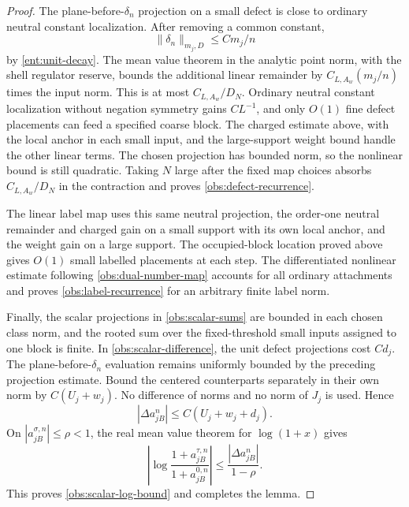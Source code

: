 \begin{proof}
The plane-before-\(\delta_n\) projection on a small defect is close
to ordinary neutral constant localization.  After removing a common
constant,
\[
                    \|\delta_n\|_{m_j,D}\le C m_j/n
\]
by \eqref{ent:unit-decay}.  The mean value theorem in the analytic
point norm, with the shell regulator reserve, bounds the additional
linear remainder by \(C_{L,A_w}(m_j/n)\) times the input norm.
This is at most \(C_{L,A_w}/D_N\).  Ordinary neutral constant
localization without negation symmetry gains \(CL^{-1}\), and only
\(O(1)\) fine defect placements can feed a specified coarse block.
The charged estimate above, with the local anchor in each small input,
and the large-support weight bound handle the other linear terms.  The
chosen projection has bounded
norm, so the nonlinear bound is still quadratic.  Taking \(N\)
large after the fixed map choices absorbs \(C_{L,A_w}/D_N\) in
the contraction and proves \eqref{obs:defect-recurrence}.

The linear label map uses this same neutral projection, the
order-one neutral remainder and charged gain on a small support with
its own local anchor, and the weight gain on a large support.  The
occupied-block
location proved above gives \(O(1)\) small labelled placements
at each step.  The differentiated nonlinear estimate following
\eqref{obs:dual-number-map} accounts for all ordinary attachments
and proves \eqref{obs:label-recurrence} for an arbitrary finite
label norm.

Finally, the scalar projections in \eqref{obs:scalar-sums} are
bounded in each chosen class norm, and the rooted sum over the
fixed-threshold small inputs assigned to one block is finite.
In \eqref{obs:scalar-difference}, the unit defect projections cost
\(Cd_j\).  The plane-before-\(\delta_n\) evaluation remains uniformly
bounded by the preceding projection estimate.  Bound the centered
counterparts separately in their own norm by \(C(U_j+w_j)\).
No difference of norms and no norm of \(J_j\) is used.  Hence
\[
                |\Delta a_{jB}^n|\le C(U_j+w_j+d_j).
\]
On \(|a_{jB}^{\sigma,n}|\le\rho<1\), the real mean value theorem
for \(\log(1+x)\) gives
\[
 \left|\log\frac{1+a_{jB}^{\tau,n}}{1+a_{jB}^{0,n}}\right|
 \le \frac{|\Delta a_{jB}^n|}{1-\rho}.
\]
This proves \eqref{obs:scalar-log-bound} and completes the lemma.
\end{proof}

